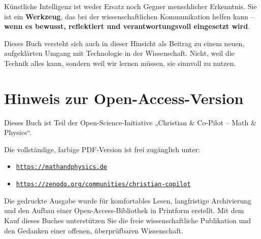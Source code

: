 Künstliche Intelligenz ist weder Ersatz noch Gegner menschlicher Erkenntnis. Sie ist ein \textbf{Werkzeug}, das bei der wissenschaftlichen Kommunikation helfen kann -- \textbf{wenn es bewusst, reflektiert und verantwortungsvoll eingesetzt wird}.

Dieses Buch versteht sich auch in dieser Hinsicht als Beitrag zu einem neuen, aufgeklärten Umgang mit Technologie in der Wissenschaft. Nicht, weil die Technik alles kann, sondern weil wir lernen müssen, sie sinnvoll zu nutzen.

\vspace{1em}

\section*{Hinweis zur Open-Access-Version}

Dieses Buch ist Teil der Open-Science-Initiative „Christian \& Co-Pilot -- Math \& Physics“.

Die vollständige, farbige PDF-Version ist frei zugänglich unter:

\begin{itemize}
	\item \href{https://mathandphysics.de}{\texttt{https://mathandphysics.de}}
	\item \href{https://zenodo.org/communities/christian-copilot}{\texttt{https://zenodo.org/communities/christian-copilot}}
\end{itemize}

Die gedruckte Ausgabe wurde für komfortables Lesen, langfristige Archivierung und den Aufbau einer Open-Access-Bibliothek in Printform erstellt. Mit dem Kauf dieses Buches unterstützen Sie die freie wissenschaftliche Publikation und den Gedanken einer offenen, überprüfbaren Wissenschaft.